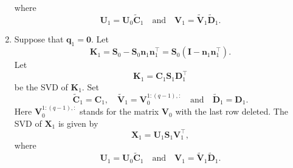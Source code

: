 \documentclass[11pt,a4paper]{article}
\newcommand{\0}{\M{0}}
\newcommand{\M}[1]{\mathbf{#1}}
\newcommand{\Mt}[1]{\tilde{\M{#1}}}
\newcommand{\T}{\top}
\newcommand{\ve}[1]{\mathbf{#1}}
\begin{document}
\begin{enumerate}[font=\upshape,label=(\roman*),wide,align=right]
\begin{displaymath}
  \end{displaymath}
  where
  \begin{displaymath}
    \M{U}_1 = \M{U}_0 \Mt{C}_1
    \quad
    \text{and}
    \quad
    \M{V}_1 = \Mt{V}_1 \Mt{D}_1.
  \end{displaymath}
\item Suppose that $\ve{q}_1 = \0$. Let
  \begin{displaymath}
    \M{K}_1
    =
    \M{S}_0 - \M{S}_0 \ve{n}_1 \ve{n}_1^\T
    =
    \M{S}_0 \left( \M{I} -  \ve{n}_1 \ve{n}_1^\T \right).
  \end{displaymath}
  Let
  \begin{displaymath}
    \M{K}_1 = \M{C}_1 \M{S}_1  \M{D}_1^\T
  \end{displaymath}
  be the SVD of $\M{K}_1$.  Set
  \begin{displaymath}
    \Mt{C}_1 = \M{C}_1,
    \quad
    \Mt{V}_1 = \M{V}_0^{1:(q - 1),:}
    \quad
    \text{and}
    \quad
    \Mt{D}_1 = \M{D}_1.
  \end{displaymath}
  Here $\M{V}_0^{1:(q - 1),:}$ stands for the matrix $\M{V}_0$ with the last row deleted. The SVD of $\M{X}_1$ is given by
  \begin{displaymath}
    \M{X}_1 = \M{U}_1 \M{S}_1\M{V}_1^\T,
  \end{displaymath}
  where
  \begin{displaymath}
    \M{U}_1 = \M{U}_0 \Mt{C}_1
    \quad
    \text{and}
    \quad
    \M{V}_1 = \Mt{V}_1 \Mt{D}_1.
  \end{displaymath}
\end{enumerate}
\end{document}
